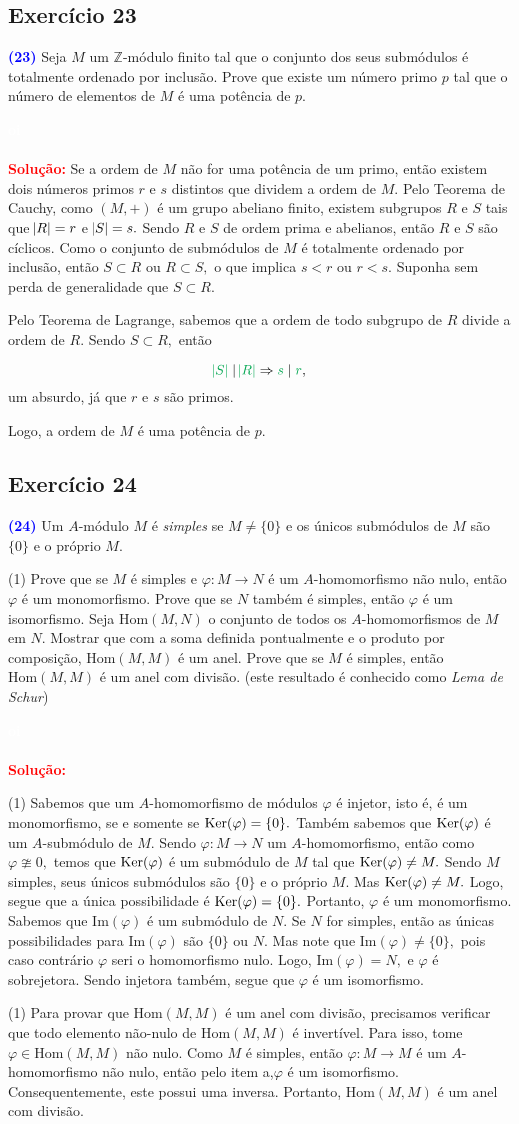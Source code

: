 \documentclass[11pt,a4paper]{article}
\newcommand{\exercicio}[1]{\subsection{Exercício #1} \textcolor{blue}{\bf(#1)}}
\newcommand{\dividiritens}[1]{\begin{tasks}[counter-format={(tsk[a])},label-width=3.6ex, label-format = {\bfseries}, column-sep = {0pt}](1) #1 \end{tasks}}
\newcommand{\pers}[1]{\textcolor{Floresta}{$\negrito{(#1)} $}}
\newcommand{\solucao}[1]{
\textbf{\textcolor{white}{oi}\\ \\ \textcolor{red}{Solução:}} #1}
\begin{document}
\exercicio{23} Seja $M$ um $\mathbb{Z}$-módulo finito tal que o conjunto dos seus submódulos é totalmente ordenado por
inclusão. Prove que existe um número primo $p$ tal que o número de elementos de $M$ é uma potência de $p.$
\solucao{
Se a ordem de $M$ não for uma potência de um primo, então existem dois números primos $r$ e $s$ distintos que dividem a ordem de $M.$ Pelo Teorema de Cauchy, como $(M, +)$ é um grupo abeliano finito, existem subgrupos $R$ e $S$ tais que $\abs{R} = r$ e $\abs{S} = s.$ Sendo $R$ e $S$ de ordem prima e abelianos, então $R$ e $S$ são cíclicos. Como o conjunto de submódulos de $M$ é totalmente ordenado por inclusão, então $S \subset R$ ou $R \subset S,$ o que implica $s < r$ ou $r < s.$ Suponha sem perda de generalidade que $S \subset R.$ 

Pelo Teorema de Lagrange, sabemos que a ordem de todo subgrupo de $R$ divide a ordem de $R.$ Sendo $S \subset R,$ então 

\[\textcolor{Green}{\abs{S}} \mid \textcolor{Green}{\abs{R}} \Rightarrow \textcolor{Green}{s} \mid \textcolor{Green}{r},\]
um absurdo, já que $r$ e $s$ são primos.

Logo, a ordem de $M$ é uma potência de $p.$
}
\exercicio{24} Um $A$-módulo $M$ é \emph{simples} se $M \neq \{0\}$ e os únicos submódulos de $M$ são $\{ 0\}$ e o próprio $M.$
\dividiritens{
\task[\pers{a}] Prove que se $M$ é simples e $\varphi \colon M \to N$ é um $A$-homomorfismo não nulo, então $\varphi$ é um
monomorfismo. Prove que se $N$ também é simples, então $\varphi$ é um isomorfismo.
\task[\pers{b}]  Seja $\mbox{Hom}(M, N)$ o conjunto de todos os $A$-homomorfismos de $M$ em $N.$ Mostrar que com a
soma definida pontualmente e o produto por composição, $\mbox{Hom}(M, M)$ é um anel. Prove que se $M$ é simples, então $\mbox{Hom}(M, M)$ é um anel com divisão. (este resultado é conhecido como
\emph{Lema de Schur})
}
\solucao{
\dividiritens{
\task[\pers{a}] Sabemos que um $A$-homomorfismo de módulos $\varphi$ é injetor, isto é, é um monomorfismo, se e somente se ${\rm Ker}(\varphi) = \{ 0 \}.$ Também sabemos que ${\rm Ker}(\varphi)$ é um $A$-submódulo de $M.$ Sendo $\varphi \colon M \to N$ um $A$-homomorfismo, então como $\varphi \ncong 0,$ temos que ${\rm Ker}(\varphi)$ é um submódulo de $M$ tal que ${\rm Ker}(\varphi) \neq M.$ Sendo $M$ simples, seus únicos submódulos são $\{ 0\}$ e o próprio $M.$ Mas ${\rm Ker}(\varphi) \neq M.$ Logo, segue que a única possibilidade é ${\rm Ker}(\varphi) = \{ 0 \}.$ Portanto, $\varphi$ é um monomorfismo.
Sabemos que $\mbox{Im}(\varphi)$ é um submódulo de $N.$ Se $N$ for simples, então as únicas possibilidades para $\mbox{Im}(\varphi)$ são $\{ 0 \}$ ou $N.$ Mas note que $\mbox{Im}(\varphi) \neq \{ 0 \},$ pois caso contrário $\varphi$ seri o homomorfismo nulo. Logo, $\mbox{Im}(\varphi) = N,$ e $\varphi$ é sobrejetora. Sendo injetora também, segue que $\varphi$ é um isomorfismo.
}
\dividiritens{
\task[\pers{b}] Para provar que $\mbox{Hom}(M, M)$ é um anel com divisão, precisamos verificar que todo elemento não-nulo de $\mbox{Hom}(M, M)$ é invertível. Para isso, tome $\varphi \in \mbox{Hom}(M, M)$ não nulo. Como $M$ é simples, então $\varphi \colon M \to M$ é um $A$-homomorfismo não nulo, então pelo item a,$\varphi$ é um isomorfismo. Consequentemente, este possui uma inversa. Portanto,  $\mbox{Hom}(M, M)$ é um anel com divisão.
}

}
\end{document}
